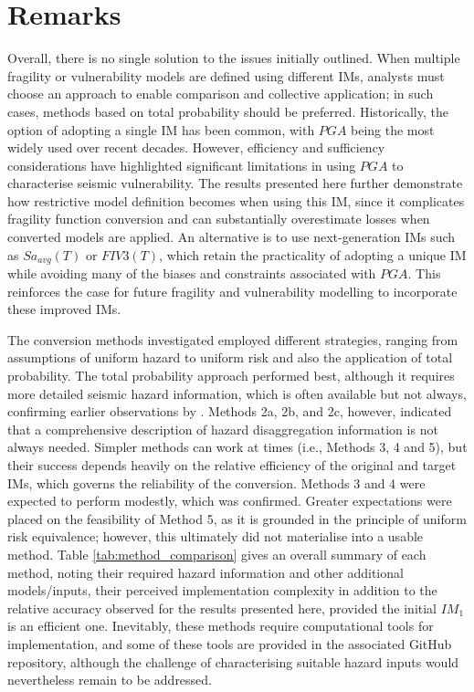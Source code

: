 \section{Remarks}
Overall, there is no single solution to the issues initially outlined. When multiple fragility or vulnerability models are defined using different \acp{IM}, analysts must choose an approach to enable comparison and collective application; in such cases, methods based on total probability should be preferred. Historically, the option of adopting a single \ac{IM} has been common, with $PGA$ being the most widely used over recent decades. However, efficiency and sufficiency considerations have highlighted significant limitations in using $PGA$ to characterise seismic vulnerability. The results presented here further demonstrate how restrictive model definition becomes when using this \ac{IM}, since it complicates fragility function conversion and can substantially overestimate losses when converted models are applied. An alternative is to use next-generation \acp{IM} such as $Sa_{avg}(T)$ or $FIV3(T)$, which retain the practicality of adopting a unique \ac{IM} while avoiding many of the biases and constraints associated with $PGA$. This reinforces the case for future fragility and vulnerability modelling to incorporate these improved \acp{IM}.

The conversion methods investigated employed different strategies, ranging from assumptions of uniform hazard to uniform risk and also the application of total probability. The total probability approach performed best, although it requires more detailed seismic hazard information, which is often available but not always, confirming earlier observations by \citet{Suzuki2020}. Methods 2a, 2b, and 2c, however, indicated that a comprehensive description of hazard disaggregation information is not always needed. Simpler methods can work at times (i.e., Methods 3, 4 and 5), but their success depends heavily on the relative efficiency of the original and target \acp{IM}, which governs the reliability of the conversion. Methods 3 and 4 were expected to perform modestly, which was confirmed. Greater expectations were placed on the feasibility of Method 5, as it is grounded in the principle of uniform risk equivalence; however, this ultimately did not materialise into a usable method. Table \ref{tab:method_comparison} gives an overall summary of each method, noting their required hazard information and other additional models/inputs, their perceived implementation complexity in addition to the relative accuracy observed for the results presented here, provided the initial $IM_1$ is an efficient one. Inevitably, these methods require computational tools for implementation, and some of these tools are provided in the associated GitHub repository, although the challenge of characterising suitable hazard inputs would nevertheless remain to be addressed. 
